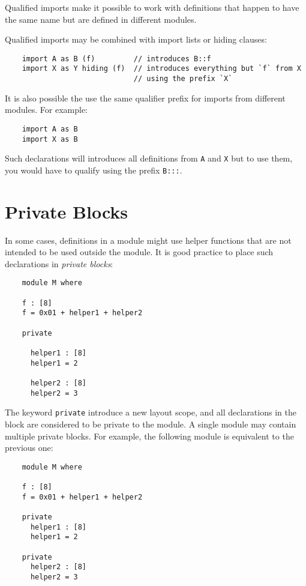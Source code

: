 Qualified imports make it possible to work with definitions
that happen to have the same name but are defined in different modules.

Qualified imports may be combined with import lists or hiding clauses:

\begin{verbatim}
    import A as B (f)         // introduces B::f
    import X as Y hiding (f)  // introduces everything but `f` from X
                              // using the prefix `X`
\end{verbatim}

It is also possible the use the same qualifier prefix for imports
from different modules.  For example:

\begin{verbatim}
    import A as B
    import X as B
\end{verbatim}

Such declarations will introduces all definitions from \texttt{A} and \texttt{X}
but to use them, you would have to qualify using the prefix \texttt{B:::}.


\section{Private Blocks}

In some cases, definitions in a module might use helper
functions that are not intended to be used outside the module.
It is good practice to place such declarations in \textit{private blocks}:


\begin{verbatim}
    module M where

    f : [8]
    f = 0x01 + helper1 + helper2

    private

      helper1 : [8]
      helper1 = 2

      helper2 : [8]
      helper2 = 3
\end{verbatim}

The keyword \texttt{private} introduce a new layout scope, and all declarations
in the block are considered to be private to the module.  A single module
may contain multiple private blocks.  For example, the following module
is equivalent to the previous one:

\begin{verbatim}
    module M where

    f : [8]
    f = 0x01 + helper1 + helper2

    private
      helper1 : [8]
      helper1 = 2

    private
      helper2 : [8]
      helper2 = 3
\end{verbatim}


